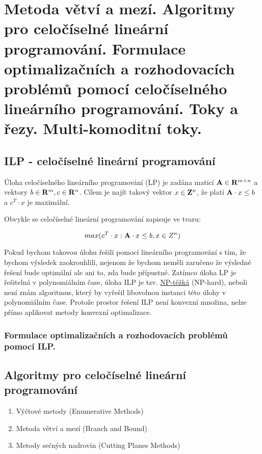 \section[KO - ILP, toky]{Metoda větví a mezí. Algoritmy pro celočíselné lineární programování. Formulace optimalizačních a rozhodovacích problémů pomocí celočíselného lineárního programování. Toky a řezy. Multi-komoditní toky.}

\subsection*{ILP - celočíselné lineární programování}

Úloha celočíselného lineárního programování (LP) je zadána maticí ${\bf A} \in {\bf R}^{m \times n}$ a vektory $b \in {\bf R}^m, c \in {\bf R}^n$. Cílem je najít takový vektor $x \in {\bf Z}^n$, že platí ${\bf A} \cdot x \leq b$ a $c^T \cdot x$ je maximální.

Obvykle se celočíselné lineární programování zapisuje ve tvaru:

	$$max(c^T \cdot x : {\bf A} \cdot x \leq b, x \in Z^n)$$
	
Pokud bychom takovou úlohu řešili pomocí lineárního programování s tím, že bychom výsledek zaokrouhlili, nejenom že bychom neměli zaručeno že výsledné řešení bude optimální ale ani to, zda bude přípustné. 
Zatímco úloha LP je řešitelná v polynomiálním čase, úloha ILP je tzv. \hyperref[heading:05-npc]{NP-těžká} (NP-hard), neboli není znám algoritmus, který by vyřešil libovolnou instanci této úlohy v polynomiálním čase. Protože prostor řešení ILP není konvexní množina, nelze přímo aplikovat metody konvexní optimalizace.

\subsubsection*{Formulace optimalizačních a rozhodovacích problémů pomocí ILP.}

\subsection*{Algoritmy pro celočíselné lineární programování}
\begin{enumerate}
	\item Výčtové metody (Enumerative Methods)
	\item Metoda větví a mezí (Branch and Bound)
	\item Metody sečných nadrovin (Cutting Planes Methods)
\end{enumerate}

